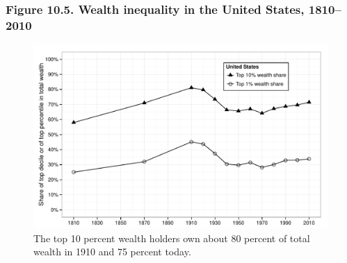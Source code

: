 \documentclass[t]{beamer}\usepackage[]{graphicx}\usepackage[]{color}
\newenvironment{knitrout}{}{} %
\begin{document}
\begin{frame}[label=Figure_10_5]
\frametitle{Figure 10.5. Wealth inequality in the United States, 1810--2010}
\begin{figure}[t]
\begin{minipage}[b]{\textwidth}
\centering
\begin{knitrout}\footnotesize
{}\color{fgcolor}

{\centering \includegraphics[width=1\linewidth]{figures/bw/Figure_10_5} 

}



\end{knitrout}
\caption{The top 10 percent wealth holders own about 80 percent of total wealth in 1910 and 75 percent today.}
\end{minipage}
\end{figure}
\end{frame}
\end{document}
